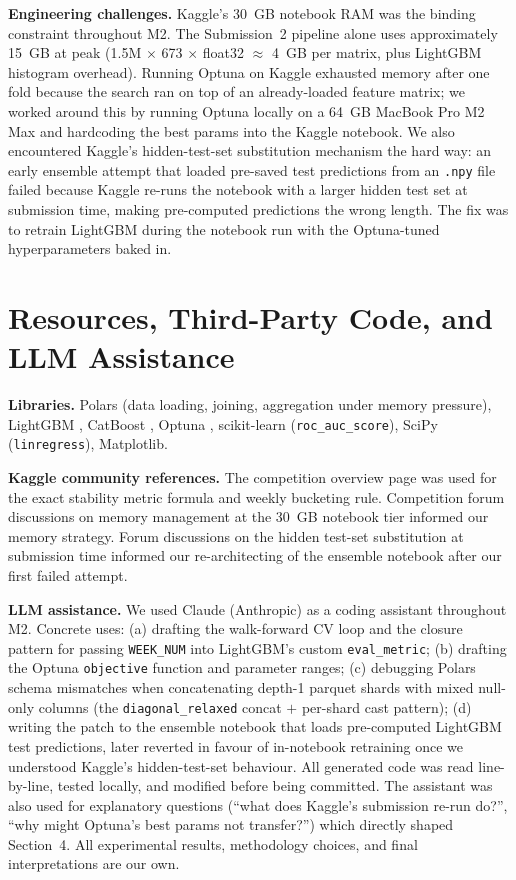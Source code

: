 \documentclass[11pt]{article}
\begin{document}
\textbf{Engineering challenges.} Kaggle's 30~GB notebook RAM was the binding constraint throughout M2. The Submission~2 pipeline alone uses approximately 15~GB at peak (1.5M $\times$ 673 $\times$ float32 $\approx$ 4~GB per matrix, plus LightGBM histogram overhead). Running Optuna on Kaggle exhausted memory after one fold because the search ran on top of an already-loaded feature matrix; we worked around this by running Optuna locally on a 64~GB MacBook Pro M2 Max and hardcoding the best params into the Kaggle notebook. We also encountered Kaggle's hidden-test-set substitution mechanism the hard way: an early ensemble attempt that loaded pre-saved test predictions from an \texttt{.npy} file failed because Kaggle re-runs the notebook with a larger hidden test set at submission time, making pre-computed predictions the wrong length. The fix was to retrain LightGBM during the notebook run with the Optuna-tuned hyperparameters baked in.

\section{Resources, Third-Party Code, and LLM Assistance}

\textbf{Libraries.} Polars (data loading, joining, aggregation under memory pressure), LightGBM \cite{lightgbm}, CatBoost \cite{catboost}, Optuna \cite{optuna}, scikit-learn (\texttt{roc\_auc\_score}), SciPy (\texttt{linregress}), Matplotlib.

\textbf{Kaggle community references.} The competition overview page \cite{kaggle} was used for the exact stability metric formula and weekly bucketing rule. Competition forum discussions on memory management at the 30~GB notebook tier informed our memory strategy. Forum discussions on the hidden test-set substitution at submission time informed our re-architecting of the ensemble notebook after our first failed attempt.

\textbf{LLM assistance.} We used Claude (Anthropic) as a coding assistant throughout M2. Concrete uses: (a) drafting the walk-forward CV loop and the closure pattern for passing \texttt{WEEK\_NUM} into LightGBM's custom \texttt{eval\_metric}; (b) drafting the Optuna \texttt{objective} function and parameter ranges; (c) debugging Polars schema mismatches when concatenating depth-1 parquet shards with mixed null-only columns (the \texttt{diagonal\_relaxed} concat $+$ per-shard cast pattern); (d) writing the patch to the ensemble notebook that loads pre-computed LightGBM test predictions, later reverted in favour of in-notebook retraining once we understood Kaggle's hidden-test-set behaviour. All generated code was read line-by-line, tested locally, and modified before being committed. The assistant was also used for explanatory questions (``what does Kaggle's submission re-run do?'', ``why might Optuna's best params not transfer?'') which directly shaped Section~4. All experimental results, methodology choices, and final interpretations are our own.
\end{document}
